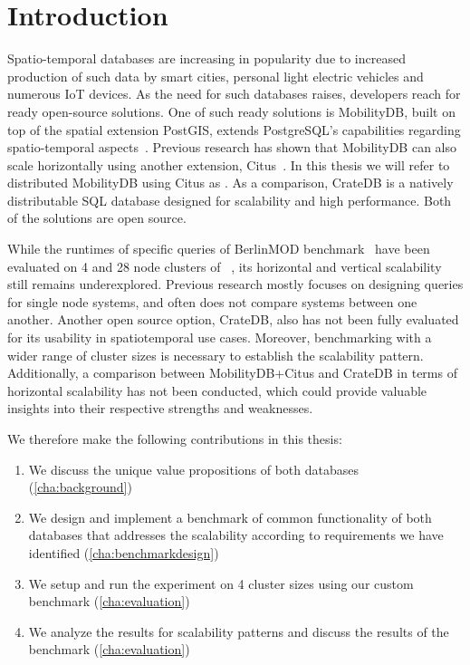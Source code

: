 \section{Introduction}
\label{cha:introduction}

Spatio-temporal databases are increasing in popularity due to increased production of such data by smart cities, personal light electric vehicles and numerous IoT devices.
As the need for such databases raises, developers reach for ready open-source solutions.
One of such ready solutions is MobilityDB, built on top of the spatial extension PostGIS, extends PostgreSQL's capabilities regarding spatio-temporal aspects~\cite{zimanyiMobilityDBMobilityDatabase2020}.
Previous research has shown that MobilityDB can also scale horizontally using another extension, Citus~\cite{bakliDistributedMobilityData2020,bakliDistributedMovingObject2019,cubukcuCitusDistributedPostgreSQL2021}.
In this thesis we will refer to distributed MobilityDB using Citus as \mobilitydbc.
As a comparison, CrateDB is a natively distributable SQL database designed for scalability and high performance.
Both of the solutions are open source.

While the runtimes of specific queries of BerlinMOD benchmark~\cite{duntgenBerlinMODBenchmarkMoving2009} have been evaluated on 4 and 28 node clusters of \mobilitydbc~\cite{bakliDistributedMobilityData2020}, its horizontal and vertical scalability still remains underexplored.
Previous research mostly focuses on designing queries for single node systems, and often does not compare systems between one another. 
Another open source option, CrateDB, also has not been fully evaluated for its usability in spatiotemporal use cases.
Moreover, benchmarking with a wider range of cluster sizes is necessary to establish the scalability pattern.
Additionally, a comparison between MobilityDB+Citus and CrateDB in terms of horizontal scalability has not been conducted, which could provide valuable insights into their respective strengths and weaknesses.

We therefore make the following contributions in this thesis:

\begin{enumerate}
    \item We discuss the unique value propositions of both databases (\cref{cha:background})
    \item We design and implement a benchmark of common functionality of both databases that addresses the scalability according to requirements we have identified (\cref{cha:benchmarkdesign})
    \item We setup and run the experiment on 4 cluster sizes using our custom benchmark (\cref{cha:evaluation})
    \item We analyze the results for scalability patterns and discuss the results of the benchmark (\cref{cha:evaluation})
\end{enumerate}
